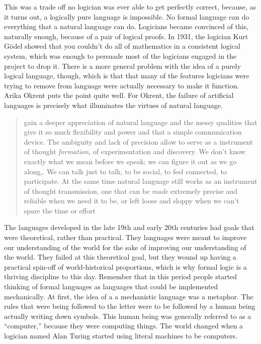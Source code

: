 This was a trade off no logician was ever able to get perfectly correct, because, as it turns out, a logically pure language is impossible. No formal language can do everything that a natural language can do. Logicians became convinced of this, naturally enough, because of a pair of logical proofs. In 1931, the logician Kurt G\"{o}del showed that you couldn't do all of mathematics in a consistent logical system, which was enough to persuade most of the logicians engaged in the project to drop it. There is a more general problem with the idea of a purely logical language, though, which is that that many of the features logicians were trying to remove from language were actually necessary to make it function. Arika Okrent puts the point quite well. For Okrent, the failure of artificial languages is precisely what illuminates the virtues of natural language. 

\begin{quotation} gain a deeper appreciation of natural language and the messy qualities that give it so much flexibility and power and that a simple communication device. The ambiguity and lack of precision allow to serve as a instrument of thought \textit{formation}, of experimentation and discovery. We don't know exactly what we mean before we speak; we can figure it out as we go along,. We can talk just to talk, to be social, to feel connected, to participate. At the same time natural language still works as an instrument of thought transmission, one that can be \textit{made} extremely precise and reliable when we need it to be, or left loose and sloppy when we can't spare the time or effort \citep{Okrent2009} \end{quotation} 

The languages developed in the late 19th and early 20th centuries had goals that were theoretical, rather than practical. They languages were meant to improve our understanding of the world for the sake of improving our understanding of the world. They failed at this theoretical goal, but they wound up having a practical spin-off of world-historical proportions, which is why formal logic is a thriving discipline to this day. Remember that in this period people started thinking of formal languages as languages that could be implemented mechanically. At first, the idea of a a mechanistic language was a metaphor. The rules that were being followed to the letter were to be followed by a human being actually writing down symbols. This human being was generally referred to as a ``computer,'' because they were computing things. The world changed when a logician named Alan Turing started using literal machines to be computers.

